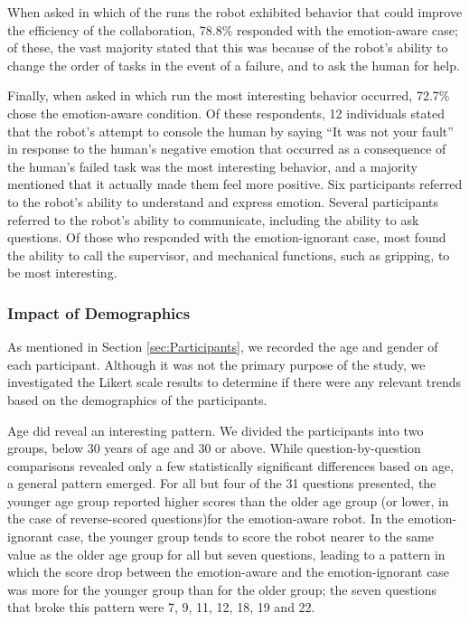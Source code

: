 \documentclass[12pt]{report}
\begin{document}
When asked in which of the runs the robot exhibited behavior that could improve
the efficiency of the collaboration, 78.8\% responded with the emotion-aware
case; of these, the vast majority stated that this was because of the robot's
ability to change the order of tasks in the event of a failure, and to ask the
human for help.

Finally, when asked in which run the most interesting behavior occurred,
72.7\% chose the emotion-aware condition. Of these respondents, 12
individuals stated that the robot's attempt to console the human by saying ``It
was not your fault'' in response to the human's negative emotion that occurred
as a consequence of the human's failed task was the most interesting behavior,
and a majority mentioned that it actually made them feel more positive. Six
participants referred to the robot's ability to understand and express emotion.
Several participants referred to the robot's ability to communicate, including
the ability to ask questions. Of those who responded with the emotion-ignorant
case, most found the ability to call the supervisor, and mechanical functions,
such as gripping, to be most interesting.

\subsubsection{Impact of Demographics} 
As mentioned in Section \ref{sec:Participants}, we recorded the age and gender
of each participant. Although it was not the primary purpose of the study, we
investigated the Likert scale results to determine if there were any relevant
trends based on the demographics of the participants.

Age did reveal an interesting pattern. We divided the participants into two
groups, below 30 years of age and 30 or above. While question-by-question
comparisons revealed only a few statistically significant differences based on
age, a general pattern emerged. For all but four of the 31 questions presented,
the younger age group reported higher scores than the older age group (or lower,
in the case of reverse-scored questions)for the emotion-aware robot. In the
emotion-ignorant case, the younger group tends to score the robot nearer to
the same value as the older age group for all but seven questions, leading to a
pattern in which the score drop between the emotion-aware and the
emotion-ignorant case was more for the younger group than for the older group;
the seven questions that broke this pattern were 7, 9, 11, 12, 18, 19 and 22.
\end{document}
